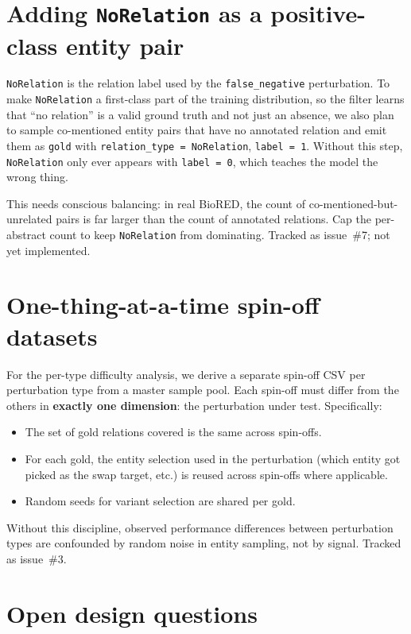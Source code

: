 \documentclass[11pt,a4paper]{article}
\newcommand{\code}[1]{\texttt{#1}}
\begin{document}
\section*{Adding \code{NoRelation} as a positive-class entity pair}

\code{NoRelation} is the relation label used by the \code{false\_negative} perturbation. To make \code{NoRelation} a first-class part of the training distribution, so the filter learns that ``no relation'' is a valid ground truth and not just an absence, we also plan to sample co-mentioned entity pairs that have no annotated relation and emit them as \code{gold} with \code{relation\_type = NoRelation}, \code{label = 1}. Without this step, \code{NoRelation} only ever appears with \code{label = 0}, which teaches the model the wrong thing.

This needs conscious balancing: in real BioRED, the count of co-mentioned-but-unrelated pairs is far larger than the count of annotated relations. Cap the per-abstract count to keep \code{NoRelation} from dominating. Tracked as issue~\#7; not yet implemented.

\section*{One-thing-at-a-time spin-off datasets}

For the per-type difficulty analysis, we derive a separate spin-off CSV per perturbation type from a master sample pool. Each spin-off must differ from the others in \textbf{exactly one dimension}: the perturbation under test. Specifically:

\begin{itemize}
\item The set of gold relations covered is the same across spin-offs.
\item For each gold, the entity selection used in the perturbation (which entity got picked as the swap target, etc.) is reused across spin-offs where applicable.
\item Random seeds for variant selection are shared per gold.
\end{itemize}

\noindent
Without this discipline, observed performance differences between perturbation types are confounded by random noise in entity sampling, not by signal. Tracked as issue~\#3.

\section*{Open design questions}
\end{document}

